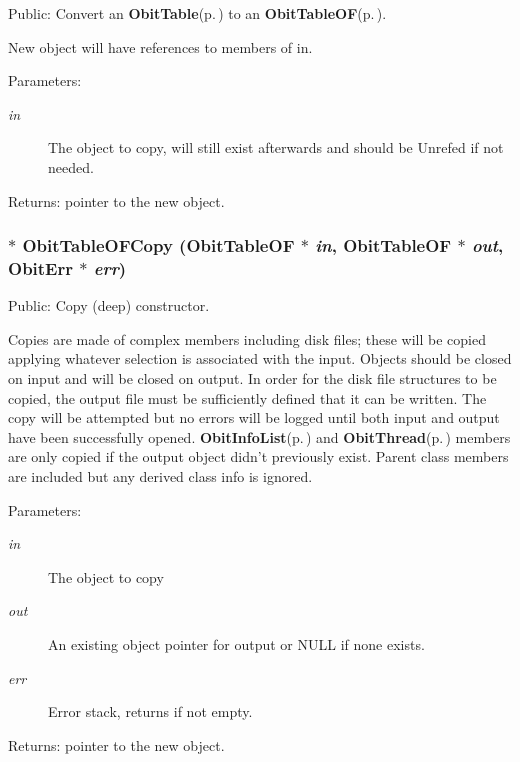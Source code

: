 Public: Convert an {\bf Obit\-Table}{\rm (p.\,\pageref{structObitTable})} to an {\bf Obit\-Table\-OF}{\rm (p.\,\pageref{structObitTableOF})}. 

New object will have references to members of in. \begin{Desc}
\item[Parameters:]
\begin{description}
\item[{\em in}]The object to copy, will still exist afterwards and should be Unrefed if not needed. \end{description}
\end{Desc}
\begin{Desc}
\item[Returns:]pointer to the new object. \end{Desc}
\subsubsection{$\ast$ Obit\-Table\-OFCopy ({\bf Obit\-Table\-OF} $\ast$ {\em in}, {\bf Obit\-Table\-OF} $\ast$ {\em out}, {\bf Obit\-Err} $\ast$ {\em err})}\label{ObitTableOF_8h_a14}


Public: Copy (deep) constructor. 

Copies are made of complex members including disk files; these will be copied applying whatever selection is associated with the input. Objects should be closed on input and will be closed on output. In order for the disk file structures to be copied, the output file must be sufficiently defined that it can be written. The copy will be attempted but no errors will be logged until both input and output have been successfully opened. {\bf Obit\-Info\-List}{\rm (p.\,\pageref{structObitInfoList})} and {\bf Obit\-Thread}{\rm (p.\,\pageref{structObitThread})} members are only copied if the output object didn't previously exist. Parent class members are included but any derived class info is ignored. \begin{Desc}
\item[Parameters:]
\begin{description}
\item[{\em in}]The object to copy \item[{\em out}]An existing object pointer for output or NULL if none exists. \item[{\em err}]Error stack, returns if not empty. \end{description}
\end{Desc}
\begin{Desc}
\item[Returns:]pointer to the new object. \end{Desc}
